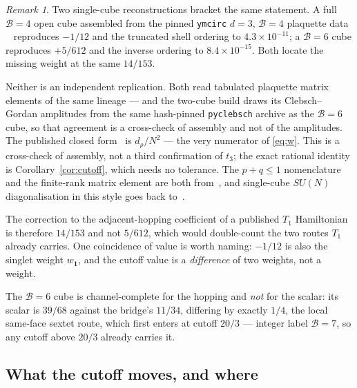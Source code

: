\documentclass[11pt]{article}
\theoremstyle{plain}
\theoremstyle{definition}
\theoremstyle{remark}
\newtheorem{remark}[theorem]{Remark}
\newcommand{\chk}[1]{}
\begin{document}
\begin{remark}
Two single-cube reconstructions bracket the same statement. A full $\mathcal B=4$ open
cube assembled from the pinned \texttt{ymcirc} $d=3$, $\mathcal B=4$ plaquette data
~\cite{Balaji2026,ymcirc2026} reproduces $-1/12$ and the truncated shell ordering to
$4.3\times10^{-11}$; a $\mathcal B=6$ cube reproduces $+5/612$ and the inverse ordering
to $8.4\times10^{-15}$. Both locate the missing weight at the same $14/153$.

Neither is an independent replication. Both read tabulated plaquette matrix
elements of the same lineage --- and the two-cube build draws its
Clebsch--Gordan amplitudes from the same hash-pinned \texttt{pyclebsch} archive
as the $\mathcal B=6$ cube, so that agreement is a cross-check of assembly and not of
the amplitudes. The published closed form~\cite{CBB2025} is
$d_\rho/N^2$ --- the very numerator of \eqref{eq:w}. This is a cross-check of
assembly, not a third confirmation of $t_3$; the exact rational identity is
Corollary~\ref{cor:cutoff}, which needs no tolerance. The $p+q\le1$
nomenclature and the finite-rank matrix element are both from~\cite{CBB2025},
and single-cube $SU(N)$ diagonalisation in this style goes back
to~\cite{CM2003}.

The correction to the adjacent-hopping coefficient of a published $T_1$
Hamiltonian is therefore $14/153$ and not $5/612$, which would double-count
the two routes $T_1$ already carries. One coincidence of value is worth naming:
$-1/12$ is also the singlet weight $w_{\mathbf 1}$, and the cutoff value is a
\emph{difference} of two weights, not a weight.
\chk{FINDING: a full T1 = B = 4 cube Hamiltonian reproduces -1/12 and the reversed shell}
\chk{FINDING: the B = 6 cube flips the sign back to +5/612, closing the decisive test}
\end{remark}

The $\mathcal B=6$ cube is channel-complete for the hopping and \emph{not} for the
scalar: its scalar is $39/68$ against the bridge's $11/34$, differing by
exactly $1/4$, the local same-face sextet route, which first enters at cutoff
$20/3$ --- integer label $\mathcal B=7$, so any cutoff above $20/3$ already carries it.
\chk{the B = 6 scalar misses the bridge's by exactly the same-face sextet route}

\subsection{What the cutoff moves, and where}
\end{document}
